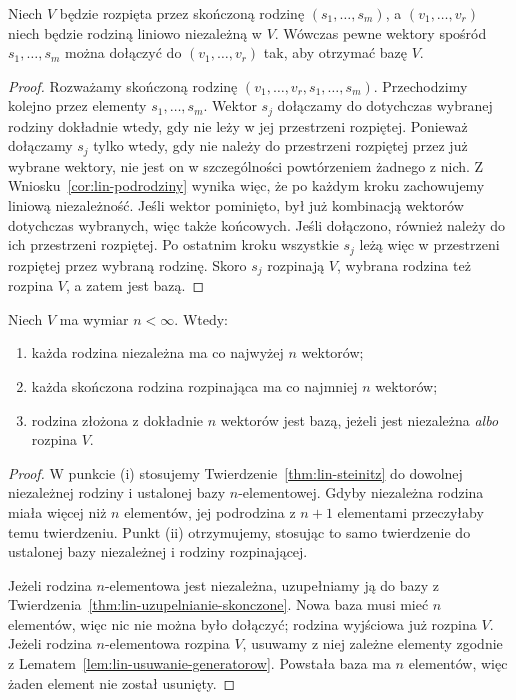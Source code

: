 \begin{twierdzenie}
\label{thm:lin-uzupelnianie-skonczone}
Niech \(V\) będzie rozpięta przez skończoną rodzinę
\((s_1,\ldots,s_m)\), a
\((v_1,\ldots,v_r)\) niech będzie rodziną
liniowo niezależną w \(V\).
Wówczas pewne wektory spośród \(s_1,\ldots,s_m\)
można dołączyć do \((v_1,\ldots,v_r)\)
tak, aby otrzymać bazę \(V\).
\end{twierdzenie}
\begin{proof}
Rozważamy skończoną rodzinę
\((v_1,\ldots,v_r,s_1,\ldots,s_m)\).
Przechodzimy kolejno przez elementy
\(s_1,\ldots,s_m\). Wektor \(s_j\) dołączamy
do dotychczas wybranej rodziny dokładnie wtedy,
gdy nie leży w jej przestrzeni rozpiętej.
Ponieważ dołączamy \(s_j\) tylko wtedy, gdy
nie należy do przestrzeni rozpiętej przez już
wybrane wektory, nie jest on w szczególności
powtórzeniem żadnego z nich.
Z Wniosku~\ref{cor:lin-podrodziny}
wynika więc, że po każdym kroku
zachowujemy liniową niezależność.
Jeśli wektor pominięto, był już kombinacją
wektorów dotychczas wybranych, więc także
końcowych. Jeśli dołączono, również należy
do ich przestrzeni rozpiętej.
Po ostatnim kroku wszystkie \(s_j\)
leżą więc w przestrzeni rozpiętej przez wybraną
rodzinę. Skoro \(s_j\) rozpinają \(V\), wybrana
rodzina też rozpina \(V\), a zatem jest bazą.
\end{proof}

\begin{wniosek}
\label{cor:lin-baza-kryteria}
Niech \(V\) ma wymiar \(n<\infty\).
Wtedy:
\begin{enumerate}[label=(\roman*)]
\item każda rodzina niezależna ma co najwyżej \(n\) wektorów;
\item każda skończona rodzina rozpinająca ma co najmniej \(n\) wektorów;
\item rodzina złożona z dokładnie \(n\) wektorów jest bazą,
      jeżeli jest niezależna \emph{albo} rozpina \(V\).
\end{enumerate}
\end{wniosek}
\begin{proof}
W punkcie (i) stosujemy Twierdzenie~\ref{thm:lin-steinitz}
do dowolnej niezależnej rodziny i ustalonej bazy
\(n\)-elementowej. Gdyby niezależna rodzina
miała więcej niż \(n\) elementów, jej podrodzina
z \(n+1\) elementami przeczyłaby temu twierdzeniu.
Punkt (ii) otrzymujemy, stosując to samo twierdzenie
do ustalonej bazy niezależnej i rodziny rozpinającej.

Jeżeli rodzina \(n\)-elementowa jest niezależna,
uzupełniamy ją do bazy z
Twierdzenia~\ref{thm:lin-uzupelnianie-skonczone}.
Nowa baza musi mieć \(n\) elementów,
więc nic nie można było dołączyć;
rodzina wyjściowa już rozpina \(V\).
Jeżeli rodzina \(n\)-elementowa rozpina \(V\),
usuwamy z niej zależne elementy
zgodnie z Lematem~\ref{lem:lin-usuwanie-generatorow}.
Powstała baza ma \(n\) elementów,
więc żaden element nie został usunięty.
\end{proof}

